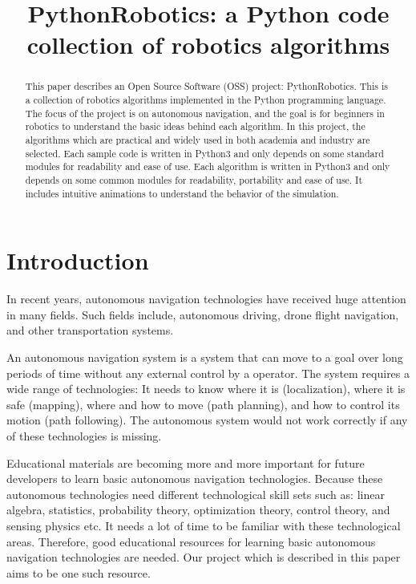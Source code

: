 \documentclass{bmvc2k}
\title{PythonRobotics: a Python code collection of robotics algorithms}
\begin{document}
\maketitle

\begin{abstract}
This paper describes an Open Source Software (OSS) project: PythonRobotics\cite{github}.
This is a collection of robotics algorithms implemented in the Python programming language.
The focus of the project is on autonomous navigation, and the goal is for beginners in robotics to understand the basic ideas behind each algorithm.
In this project, the algorithms which are practical and widely used in both academia and industry are selected.
Each sample code is written in Python3 and only depends on some standard modules for readability and ease of use.
Each algorithm is written in Python3 and only depends on some common modules for readability, portability and ease of use.
It includes intuitive animations to understand the behavior of the simulation.

\end{abstract}

\section{Introduction}

In recent years, autonomous navigation technologies have received huge attention in many fields. 
Such fields include, autonomous driving\cite{pathplanning}, drone flight navigation, and other transportation systems.

An autonomous navigation system is a system that can move to a goal over long periods of time without any external control by a operator.
The system requires a wide range of technologies:
It needs to know where it is (localization), where it is safe (mapping), where and how to move (path planning), and how to control its motion (path following). 
The autonomous system would not work correctly if any of these technologies is missing.

Educational materials are becoming more and more important for future developers to learn basic autonomous navigation technologies.
Because these autonomous technologies need different technological skill sets such as: linear algebra, statistics, probability theory, optimization theory, control theory, and sensing physics etc. 
It needs a lot of time to be familiar with these technological areas.
Therefore, good educational resources for learning basic autonomous navigation technologies are needed.
Our project which is described in this paper aims to be one such resource.
\end{document}
